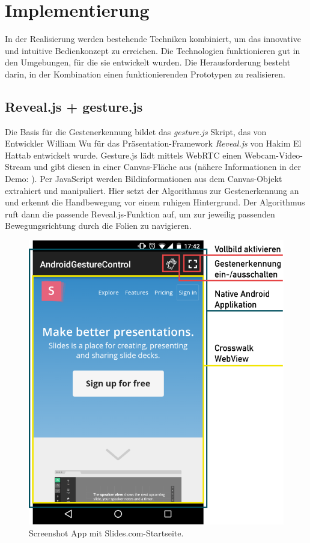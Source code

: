 \documentclass{article}
\begin{document}
\section{Implementierung}
In der Realisierung werden bestehende Techniken kombiniert, um das innovative und intuitive Bedienkonzept zu erreichen. Die Technologien funktionieren gut in den Umgebungen, für die sie entwickelt wurden. Die Herausforderung besteht darin, in der Kombination einen funktionierenden Prototypen zu realisieren.

\subsection{Reveal.js + gesture.js}
Die Basis für die Gestenerkennung bildet das \textit{gesture.js} Skript, das von Entwickler William Wu für das Präsentation-Framework \textit{Reveal.js} \cite{Hattab2015} von Hakim El Hattab entwickelt wurde. Gesture.js lädt mittels WebRTC einen Webcam-Video-Stream und gibt diesen in einer Canvas-Fläche aus (nähere Informationen in der Demo: \cite{Wu}). Per JavaScript werden Bildinformationen aus dem Canvas-Objekt extrahiert und manipuliert. Hier setzt der Algorithmus zur Gestenerkennung an und erkennt die Handbewegung vor einem ruhigen Hintergrund. Der Algorithmus ruft dann die passende Reveal.js-Funktion auf, um zur jeweilig passenden Bewegungsrichtung durch die Folien zu navigieren.


\begin{figure}[htb]
\begin{minipage}[b]{1.0\linewidth}
  \centering
\centerline{\includegraphics[width=1\linewidth]{screenshot-ui-beschriftet.png}}
\end{minipage}
\caption{Screenshot App mit Slides.com-Startseite.}
\label{fig:ui}
\end{figure}
\end{document}
